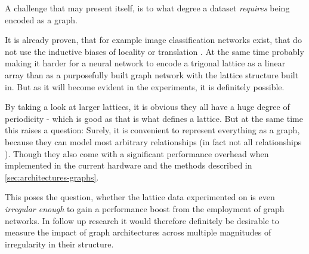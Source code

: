 A challenge that may present itself, is to what degree a dataset \emph{requires} being encoded as a graph.

It is already proven, that for example image classification networks exist, that do not use the inductive biases of locality or translation \cite{imageWorth16x16}. 
At the same time probably making it harder for a neural network to encode a trigonal lattice as a linear array than as a purposefully built graph network with the lattice structure built in.
But as it will become evident in the experiments, it is definitely possible. 

By taking a look at larger lattices, it is obvious they all have a huge degree of periodicity - which is good as that is what defines a lattice.
But at the same time this raises a question: Surely, it is convenient to represent everything as a graph, because they can model most arbitrary relationships (in fact not all relationships \cite{relationalInductiveBiasesAndGraphNetworks}). 
Though they also come with a significant performance overhead when implemented in the current hardware and the methods described in \autoref{sec:architectures-graphs}. 

This poses the question, whether the lattice data experimented on is even \emph{irregular enough} to gain a performance boost from the employment of graph networks.
In follow up research it would therefore definitely be desirable to measure the impact of graph architectures across multiple magnitudes of \glqq irregularity\grqq{} in their structure.
